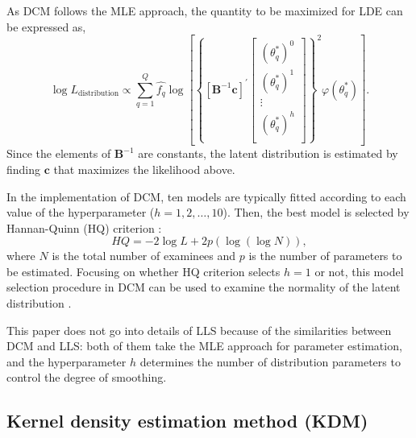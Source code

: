 As DCM follows the MLE approach, the quantity to be maximized for
LDE can be expressed as,
\begin{equation}
\log{L_{\text{distribution}}} \propto
\sum_{q = 1}^{Q}{
\hat{f_{q}}
\log\left[
\left\{
\left[ \mathrm{\mathbf{B}}^{-1} \mathrm{\mathbf{c}} \right]^{'}
\begin{bmatrix}
\left( \theta_{q}^{*} \right)^{0} \\
\left( \theta_{q}^{*} \right)^{1} \\
\vdots \\
\left( \theta_{q}^{*} \right)^{h} \\
\end{bmatrix}
\right\}^{2}
\varphi{\left( \theta_{q}^{*} \right)}
\right]
}.
\label{eq:dcmlikeli}
\end{equation}
Since the elements of \(\mathrm{\mathbf{B}}^{-1}\) are constants, the
latent distribution is estimated by finding \(\mathrm{\mathbf{c}}\) that
maximizes the likelihood above.

In the implementation of DCM, ten models are typically fitted according to each
value of the hyperparameter (\(h = 1, 2, \dots, 10\)). Then, the best model is selected by
Hannan-Quinn (HQ) criterion \citep{Hannan+Quinn:1979}:
\begin{equation}
HQ = -2 \log{L} + 2 p \left( \log{(\log{N})} \right),
\label{eq:hq}
\end{equation}
where \(N\) is the total number of examinees and \(p\) is the number of
parameters to be estimated. Focusing on whether HQ criterion selects
\(h = 1\) or not, this model selection procedure in DCM can be used to
examine the normality of the latent distribution \citep{Woods+Lin:2009}.

This paper does not go into details of LLS \citep{Casabianca+Lewis:2015, Xu+vonDavier:2008}
because of the similarities between DCM and LLS: both of them
take the MLE approach for parameter estimation, and the hyperparameter \(h\)
determines the number of distribution parameters to control the degree of smoothing.

\hypertarget{kernel-density-estimation-method-kdm}{%
\subsection{Kernel density estimation method (KDM)}\label{kernel-density-estimation-method-kdm}}

